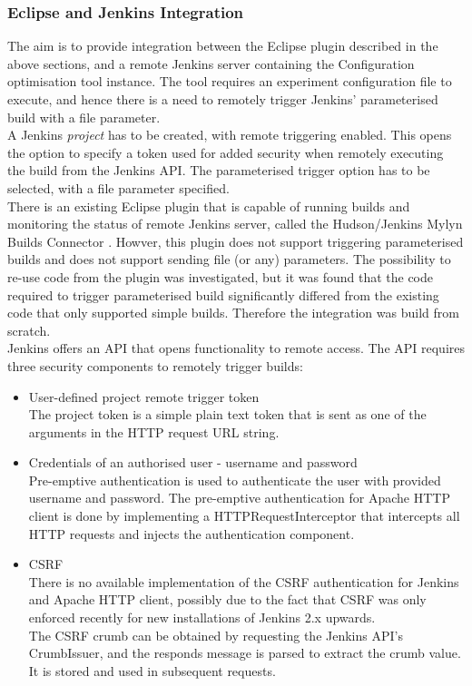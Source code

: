 \subsubsection{Eclipse and Jenkins Integration}
The aim is to provide integration between the Eclipse plugin described in the above sections, and a remote Jenkins server containing the Configuration optimisation tool instance. The tool requires an experiment configuration file to execute, and hence there is a need to remotely trigger Jenkins' parameterised build with a file parameter.\\
A Jenkins \textit{project} has to be created, with remote triggering enabled. This opens the option to specify a token used for added security when remotely executing the build from the Jenkins API. The parameterised trigger option has to be selected, with a file parameter specified.\\
There is an existing Eclipse plugin that is capable of running builds and monitoring the status of remote Jenkins server, called the Hudson/Jenkins Mylyn Builds Connector \cite{mylyn}. Howver, this plugin does not support triggering parameterised builds and does not support sending file (or any) parameters. The possibility to re-use code from the plugin was investigated, but it was found that the code required to trigger parameterised build significantly differed from the existing code that only supported simple builds. Therefore the integration was build from scratch.\\
Jenkins offers an API that opens functionality to remote access. The API requires three security components to remotely trigger builds: \cite{remoteapi}
\begin{itemize}
\item User-defined project remote trigger token\\
The project token is a simple plain text token that is sent as one of the arguments in the HTTP request URL string.
\item Credentials of an authorised user - username and password\\
Pre-emptive authentication is used to authenticate the user with provided username and password. The pre-emptive authentication for Apache HTTP client is done by implementing a HTTPRequestInterceptor that intercepts all HTTP requests and injects the authentication component.
\item CSRF\\
There is no available implementation of the CSRF authentication for Jenkins and Apache HTTP client, possibly due to the fact that CSRF was only enforced recently for new installations of Jenkins 2.x upwards.\\
The CSRF crumb can be obtained by requesting the Jenkins API's CrumbIssuer, and the responds message is parsed to extract the crumb value. It is stored and used in subsequent requests.
\end{itemize}
